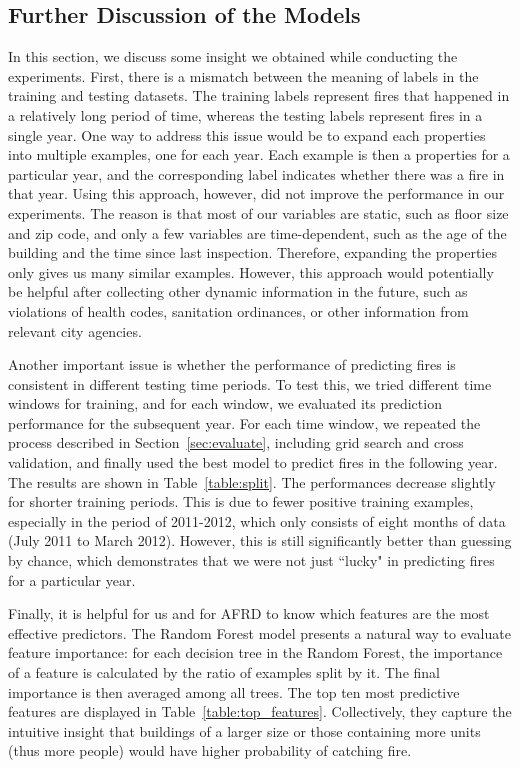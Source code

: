 \documentclass{sig-alternate-05-2015}
\begin{document}
{\subsection{Further Discussion of the Models}
In this section, we discuss some insight we obtained while conducting the experiments. First, there is a mismatch between the meaning of labels in the training and testing datasets. The training labels represent fires that happened in a relatively long period of time, whereas the testing labels represent fires in a single year. One way to address this issue would be to expand each properties into multiple examples, one for each year. Each example is then a properties for a particular year, and the corresponding label indicates whether there was a fire in that year. Using this approach, however, did not improve the performance in our experiments. The reason is that most of our variables are static, such as floor size and zip code, and only a few variables are time-dependent, such as the age of the building and the time since last inspection. Therefore, expanding the properties only gives us many similar examples. However, this approach would potentially be helpful after collecting other dynamic information in the future, such as violations of health codes, sanitation ordinances, or other information from relevant city agencies.

Another important issue is whether the performance of predicting fires is consistent in different testing time periods. 
To test this, we tried different time windows for training, and for each window, we evaluated its prediction performance for the subsequent year. 
For each time window, we repeated the process described in Section~\ref{sec:evaluate}, including grid search and cross validation, and finally used the best model to predict fires  in the following year. 
The results are shown in Table~\ref{table:split}. The performances decrease slightly for shorter training periods. This is due to fewer positive training examples, especially in the period of 2011-2012, which only consists of eight months of data (July 2011 to March 2012). However, this is still significantly better than guessing by chance, which demonstrates that we were not just ``lucky" in predicting fires for a particular year.

Finally, it is helpful for us and for AFRD to know which features are the most effective predictors. The Random Forest model presents a natural way to evaluate feature importance: for each decision tree in the Random Forest, the importance of a feature is calculated by the ratio of examples split by it. 
The final importance is then averaged among all trees. 
The top ten most predictive features are displayed in Table~\ref{table:top_features}.
Collectively, they capture the intuitive insight that buildings of a larger size or those containing more units (thus more people) would have higher probability of catching fire. 

}
\end{document}
